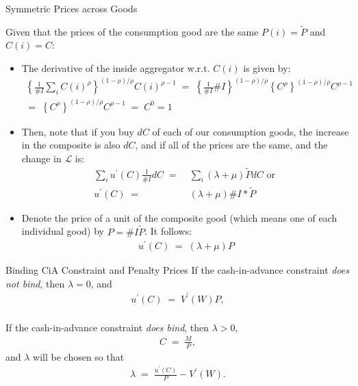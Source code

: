 \documentclass[10pt,c,aspectratio=1610,handout]{beamer}
\begin{document}
\begin{frame}{Symmetric Prices across Goods}%
  \begin{small}%
    Given that the prices of the consumption good are the same $P(i)=\tilde{P}$ and $C(i)=C$:%
    \pause%
    \begin{itemize}%
      \item[$\blacktriangleright$] The derivative of the inside aggregator w.r.t. $C(i) $ is given by:%
      \begin{align*}
        \left\{ \frac{1}{\#I}\sum_{i}C(i)^{\rho }\right\} ^{(1-\rho )/\rho}C(i)^{\rho -1} \; = \; \left\{ \frac{1}{\#I}\#I\right\} ^{(1-\rho )/\rho}\left\{ C^{\rho }\right\} ^{(1-\rho )/\rho }C^{\rho -1} \\%
        = \; \left\{ C^{\rho }\right\} ^{(1-\rho )/\rho }C^{\rho -1} \; = \; C^{0}=1%
      \end{align*}
      \vspace*{-0.2in}%
      \pause%
      \item[$\blacktriangleright$] Then, note that if you buy $dC$ of each of our consumption goods,  the increase in the composite is also $dC$, and if all of the prices are the same, and the change in $\mathcal{L}$ is:%
      \begin{align*}%
        \sum_{i}u^{\prime }(C)\frac{1}{\#I}dC \; = & \; \sum_{i}\left( \lambda +\mu \right) \tilde{P}dC\text{ or } \\%
        u^{\prime }(C) \; = & \; \left( \lambda +\mu \right) \#I \ast \tilde{P}%
      \end{align*}%
      \vspace*{-0.2in}%
      \pause%
      \item[$\blacktriangleright$] Denote the price of a unit of the composite good (which means one of each individual good) by $P=\#I\tilde{P}$. It follows:%
      \begin{align}%
        u^{\prime }(C) \; = \; \left( \lambda +\mu \right) P  \label{foc cons A}%
      \end{align}%
    \end{itemize}%
  \end{small}%
\end{frame}%
\begin{frame}{Binding CiA Constraint and Penalty Prices}%
  If the cash-in-advance constraint \emph{does not bind}, then $\lambda =0$, and%
  \begin{align}%
    u^{\prime }(C) \; = \; V^{\prime }(W)P,  \label{foc cons A1}%
  \end{align}\\%
  \vspace*{0.25in}%
  \pause%
  If the cash-in-advance constraint \emph{does bind}, then $\lambda >0,$%
  \begin{align}%
    C \; = \; \frac{M}{P},  \label{foc cons A2}%
  \end{align}%
  and $\lambda $ will be chosen so that%
  \begin{align*}%
    \lambda \; = \; \frac{u^{\prime }(C)}{P}-V^{\prime }(W).%
  \end{align*}%
\end{frame}%
\end{document}

